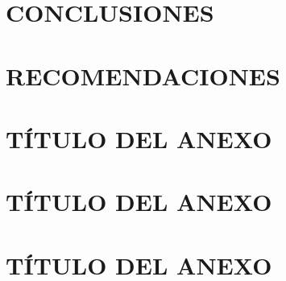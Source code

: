 \documentclass[letterpaper,titlepage,12pt,oneside,spanish,final]{report_eie}
\numberwithin{equation}{chapter}%
\numberwithin{figure}{chapter}%
\numberwithin{table}{chapter}%
\numberwithin{definition}{chapter}%
\numberwithin{lemma}{chapter}%
\numberwithin{theorem}{chapter}%
\numberwithin{corollary}{chapter}%
\numberwithin{condition}{chapter}%
\numberwithin{criterion}{chapter}%
\numberwithin{problem}{chapter}%
\numberwithin{property}{chapter}%
\numberwithin{proposition}{chapter}%
\numberwithin{solution}{chapter}%
\numberwithin{conjecture}{chapter}%
\begin{document}
\chapter{CONCLUSIONES}\label{CAP:conclu}
%

\chapter{RECOMENDACIONES}\label{CAP:recomendaciones}
%

\appendix
\chapter{TÍTULO DEL ANEXO}\label{CAP:anexo0}

\chapter{TÍTULO DEL ANEXO}\label{CAP:anexo1}

\chapter{TÍTULO DEL ANEXO}\label{CAP:anexo2}




\newpage

\printbibliography[title={REFERENCIAS}]
\newpage




\printindex%
\end{document}
